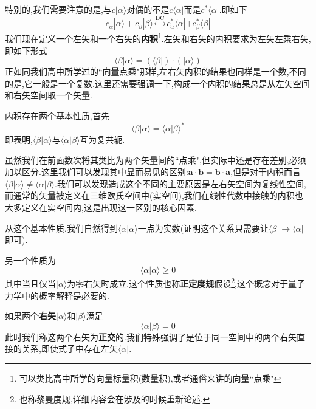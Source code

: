 \documentclass[lang=cn,newtx,10pt,scheme=chinese,thmcnt=section]{elegantbook}
\begin{document}
特别的,我们需要注意的是,与$c|\alpha\rangle$对偶的不是$c\langle\alpha|$而是$c^*\langle\alpha|$.即如下
\begin{equation}
	c_\alpha|\alpha\rangle+c_\beta|\beta\rangle\overset{\mathrm{DC}}{\operatorname*{\longleftrightarrow}}c_\alpha^*\langle\alpha|+c_\beta^*\langle\beta|
\end{equation}
我们现在定义一个左矢和一个右矢的\textbf{内积}\footnote{可以类比高中所学的向量标量积(数量积),或者通俗来讲的向量``点乘"}.左矢和右矢的内积要求为左矢左乘右矢,即如下形式
\begin{equation}
	\langle\beta|\alpha\rangle=(\langle\beta|)\cdot(|\alpha\rangle)
\end{equation}
正如同我们高中所学过的``向量点乘"那样,左右矢内积的结果也同样是一个数,不同的是,它一般是一个复数.这里还需要强调一下,构成一个内积的结果总是从左矢空间和右矢空间取一个矢量.

内积存在两个基本性质,首先
\begin{equation}\label{eq1.9}
	\langle\beta|\alpha\rangle=\langle\alpha|\beta\rangle^*
\end{equation}
即表明,$\langle\beta|\alpha\rangle$与$\langle\alpha|\beta\rangle$互为复共轭.\\
\begin{remark}
	虽然我们在前面数次将其类比为两个矢量间的``点乘",但实际中还是存在差别,必须加以区分.这里我们可以发现其中显而易见的区别:$\mathbf{a}\cdot\mathbf{b}=\mathbf{b}\cdot\mathbf{a}$,但是对于内积而言$\langle\beta|\alpha\rangle\ne\langle\alpha|\beta\rangle$.我们可以发现造成这个不同的主要原因是左右矢空间为复线性空间,而通常的矢量被定义在三维欧氏空间中(实空间),我们在线性代数中接触的内积也大多定义在实空间内,这是出现这一区别的核心因素.
\end{remark}

从这个基本性质,我们自然得到$\langle\alpha|\alpha\rangle$一点为实数(证明这个关系只需要让$\langle\beta|\rightarrow\langle\alpha|$即可).

另一个性质为
\begin{equation}
	\langle\alpha|\alpha\rangle\geqslant0
\end{equation}
其中当且仅当$|\alpha\rangle$为零右矢时成立.这个性质也称\textbf{正定度规}假设\footnote{也称黎曼度规,详细内容会在涉及的时候重新论述.},这个概念对于量子力学中的概率解释是必要的.

如果两个\textbf{右矢}$|\alpha\rangle$和$|\beta\rangle$满足
\begin{equation}
	\langle\alpha|\beta\rangle=0
\end{equation}
此时我们称这两个右矢为\textbf{正交}的.我们特殊强调了是位于同一空间中的两个右矢直接的关系,即使式子中存在左矢$\langle\alpha|$.
\end{document}
